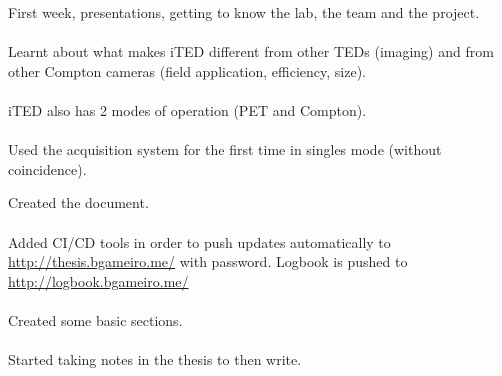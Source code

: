 \begin{minipage}[t][0.45\textheight][t]{0.97\linewidth}
\begin{minipage}[t]{0.49\textwidth}
  \end{minipage}
  \begin{minipage}[t]{0.49\textwidth}
    \begin{minipage}[t][0.22\textheight][t]{\textwidth}
        First week, presentations, getting to know the lab, the team and the project.\\~\\
        Learnt about what makes iTED different from other TEDs (imaging) and from other Compton cameras (field application, efficiency, size).\\~\\
        iTED also has 2 modes of operation (PET and Compton).\\~\\
        Used the acquisition system for the first time in singles mode (without coincidence).
    \end{minipage}
    \begin{minipage}[t][0.22\textheight][t]{\textwidth}
        Created the document.\\~\\
        Added CI/CD tools in order to push updates automatically to \url{http://thesis.bgameiro.me/} with password. Logbook is pushed to \url{http://logbook.bgameiro.me/}\\~\\
        Created some basic sections.\\~\\
        Started taking notes in the thesis to then write.
    \end{minipage}
  \end{minipage}  
\end{minipage}

